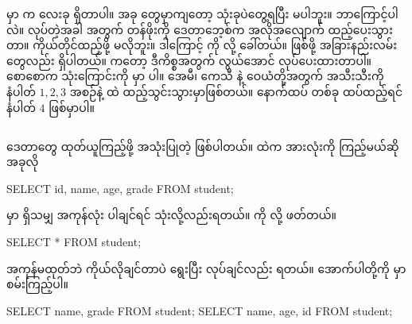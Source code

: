  မှာ  က လေးခု ရှိတာပါ။ အခု  တွေမှာကျတော့ သုံးခုပဲတွေ့ရပြီး  မပါဘူး။ ဘာကြောင့်ပါလဲ။  လုပ်တဲ့အခါ   အတွက် တန်ဖိုးကို ဒေတာဘေ့စ်က အလိုအလျောက် ထည့်ပေးသွားတာ။ ကိုယ်တိုင်ထည့်ဖို့ မလိုဘူး။ ဒါကြောင့်   ကို    လို့ ခေါ်တယ်။  ဖြစ်ဖို့ အခြားနည်းလမ်းတွေလည်း ရှိပါတယ်။  ကတော့ ဒီကိစ္စအတွက် လွယ်အောင် လုပ်ပေးထားတာပါ။ စောစောက  သုံးကြောင်းကို  မှာ  ပါ။ အေမီ၊ ကေသီ နဲ့ ဝေယံတို့အတွက်  အသီးသီးကို  နံပါတ် $1,2,3$ အစဉ်နဲ့  ထဲ ထည့်သွင်းသွားမှာဖြစ်တယ်။ နောက်ထပ်  တစ်ခု ထပ်ထည့်ရင်  နံပါတ် $4$ ဖြစ်မှာပါ။


\subsection*{}
 ဒေတာတွေ ထုတ်ယူကြည့်ဖို့ အသုံးပြုတဲ့  ဖြစ်ပါတယ်။  ထဲက  အားလုံးကို ကြည့်မယ်ဆို အခုလို 
%
\begin{sql}
SELECT id, name, age, grade FROM student;
\end{sql}
%
 မှာ ရှိသမျှ  အကုန်လုံး ပါချင်ရင်  သုံးလို့လည်းရတယ်။  ကို  လို့ ဖတ်တယ်။
%
\begin{sql}
SELECT * FROM student;
\end{sql}
%

\begin{figure}[tbh!]
\caption{} 
\label{fig:selectstu}
\end{figure}

 အကုန်မထုတ်ဘဲ ကိုယ်လိုချင်တာပဲ ရွေးပြီး  လုပ်ချင်လည်း ရတယ်။ အောက်ပါတို့ကို  မှာ စမ်းကြည့်ပါ။
%
\begin{sql}
SELECT name, grade FROM student;
SELECT name, age, id FROM student;
\end{sql}
%

